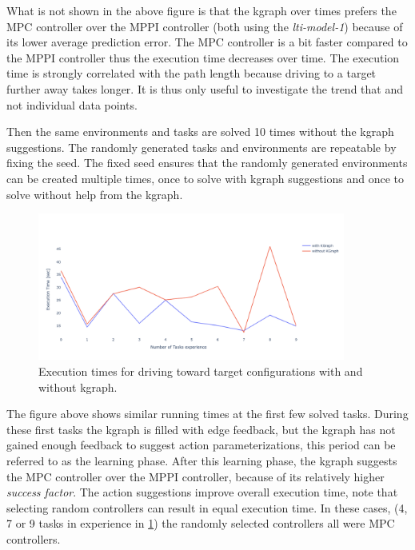 What is not shown in the above figure is that the \ac{kgraph} over times prefers the \ac{MPC} controller over the \ac{MPPI} controller (both using the \textit{lti-model-1}) because of its lower average prediction error. The \ac{MPC} controller is a bit faster compared to the \ac{MPPI} controller thus the execution time decreases over time. The execution time is strongly correlated with the path length because driving to a target further away takes longer. It is thus only useful to investigate the trend that  and not individual data points.\bs

Then the same environments and tasks are solved 10 times without the \ac{kgraph} suggestions. The randomly generated tasks and environments are repeatable by fixing the seed. The fixed seed ensures that the randomly generated environments can be created multiple times, once to solve with \ac{kgraph} suggestions and once to solve without help from the \ac{kgraph}.\bs

\begin{figure}[H]
    \centering
    \includegraphics[width=0.9\textwidth]{figures/results/random_drive_with_without_kgraph}
    \caption{Execution times for driving toward target configurations with and without \ac{kgraph}.}%
    \label{fig:results_random_drive_task}
\end{figure}

The figure above shows similar running times at the first few solved tasks. During these first tasks the \ac{kgraph} is filled with edge feedback, but the \ac{kgraph} has not gained enough feedback to suggest action parameterizations, this period can be referred to as the learning phase. After this learning phase, the \ac{kgraph} suggests the \ac{MPC} controller over the \ac{MPPI} controller, because of its relatively higher \textit{success factor}. The action suggestions improve overall execution time, note that selecting random controllers can result in equal execution time. In these cases, (4, 7 or 9 tasks in experience in \cref{fig:results_random_drive_task}) the randomly selected controllers all were \ac{MPC} controllers.\bs

